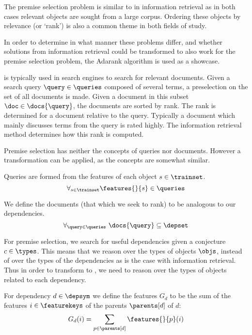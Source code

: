 The premise selection problem is similar to \ltr in information retrieval
as in both cases relevant objects are sought from a large corpus.
Ordering these objects by relevance (or `rank') is also a common theme in both fields of study.

In order to determine in what manner these problems differ, and whether solutions
from information retrieval could be transformed to also work for the premise selection problem,
the Adarank algorithm \cite{xu2007adarank} is used as a showcase.

\ltr is typically used in search engines to search for relevant documents.
Given a search query $\query \in \queries$ composed of several terms, a preselection on the set of
all documents is made. Given a document in this subset $\doc \in \docs{\query}$,
the documents are sorted by rank.
The rank is determined for a document relative to the query.
Typically a document which mainly discusses terms from the query is rated highly.
The information retrieval method determines how this rank is computed.

Premise selection has neither the concepts of queries nor documents.
However a transformation can be applied, as the concepts are somewhat similar.

\begin{definition}
  Queries are formed from the features of each object $s \in \trainset$.
  \[
    \forall_{s \in \trainset} \features{}{s} \in \queries
  \]
\end{definition}

\begin{definition}
  We define the documents (that which we seek to rank) to be analogous to our dependencies.
  \[
    \forall_{\query \in \queries}~ \docs{\query} \subseteq \depset
  \]
\end{definition}

For premise selection, we search for useful dependencies given a conjecture $c \in \types$.
This means that we reason over the types of objects $\objs$,
instead of over the types of the dependencies as is the case with information retrieval.
Thus in order to transform to \ltr, we need to reason over the types of objects related to each dependency.

\begin{definition}
  For dependency $d \in \depsym$ we define the features $G_d$ to be the sum of
  the features $i \in \featurekeys$ of the parents $\parents[d]$ of $d$:
  \[
    G_d(i) = \sum_{p \in \parents[d]} \features{}{p}(i)
  \]
\end{definition}

